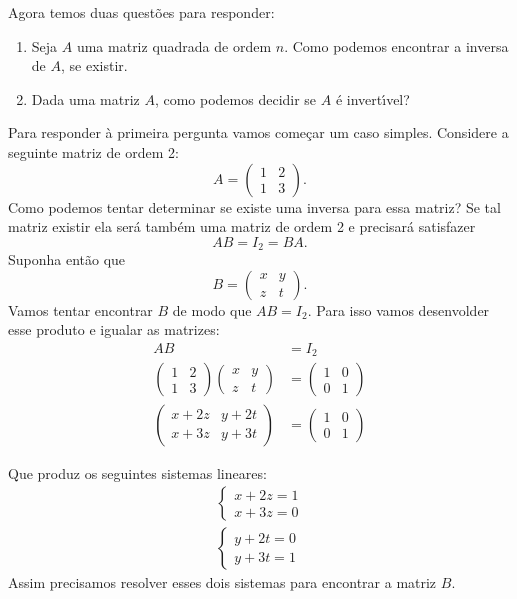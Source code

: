 Agora temos duas questões para responder:
\begin{enumerate}[label={\arabic*})]
    \item Seja $A$ uma matriz quadrada de ordem $n$. Como podemos encontrar a inversa de $A$, se existir.

    \item Dada uma matriz $A$, como podemos decidir se $A$ \'e invert{\'\i}vel?
\end{enumerate}

Para responder à primeira pergunta vamos começar um caso simples. Considere a seguinte matriz de ordem 2:
\[
    A = \begin{pmatrix}
        1 & 2\\1 & 3
    \end{pmatrix}.
\]
Como podemos tentar determinar se existe uma inversa para essa matriz? Se tal matriz existir ela será também uma matriz de ordem 2 e precisará satisfazer
\[
    AB = I_2 = BA.
\]
Suponha então que
\[
    B = \begin{pmatrix}
        x & y\\z & t
    \end{pmatrix}.
\]
Vamos tentar encontrar $B$ de modo que $AB = I_2$. Para isso vamos desenvolder esse produto e igualar as matrizes:
\begin{align*}
    AB &= I_2\\
    \begin{pmatrix}1 & 2\\1 & 3\end{pmatrix}\begin{pmatrix}x & y\\z & t\end{pmatrix} &= \begin{pmatrix}1 & 0\\0 & 1\end{pmatrix}\\
    \begin{pmatrix}x + 2z & y + 2t\\x + 3z & y + 3t\end{pmatrix} &= \begin{pmatrix}1 & 0\\0 & 1\end{pmatrix}
\end{align*}

Que produz os seguintes sistemas lineares:
\begin{align}
    \begin{cases}\label{primeirosistema}
        x + 2z = 1\\
        x + 3z = 0
    \end{cases}\\
    \begin{cases}\label{segundosistema}
        y + 2t = 0\\
        y + 3t = 1
    \end{cases}
\end{align}
Assim precisamos resolver esses dois sistemas para encontrar a matriz $B$.

